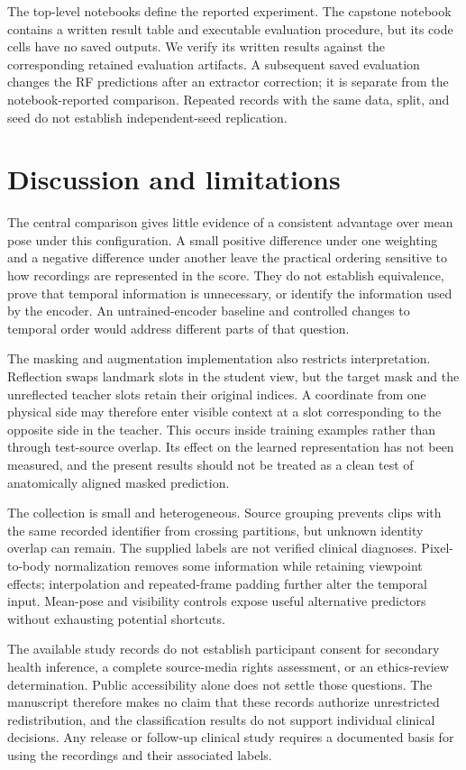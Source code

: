 \documentclass[10pt,twocolumn,letterpaper]{article}
\begin{document}
The top-level notebooks define the reported experiment. The capstone notebook contains a written result table and executable evaluation procedure, but its code cells have no saved outputs. We verify its written results against the corresponding retained evaluation artifacts. A subsequent saved evaluation changes the RF predictions after an extractor correction; it is separate from the notebook-reported comparison. Repeated records with the same data, split, and seed do not establish independent-seed replication.

\section{Discussion and limitations}
The central comparison gives little evidence of a consistent advantage over mean pose under this configuration. A small positive difference under one weighting and a negative difference under another leave the practical ordering sensitive to how recordings are represented in the score. They do not establish equivalence, prove that temporal information is unnecessary, or identify the information used by the encoder. An untrained-encoder baseline and controlled changes to temporal order would address different parts of that question.

The masking and augmentation implementation also restricts interpretation. Reflection swaps landmark slots in the student view, but the target mask and the unreflected teacher slots retain their original indices. A coordinate from one physical side may therefore enter visible context at a slot corresponding to the opposite side in the teacher. This occurs inside training examples rather than through test-source overlap. Its effect on the learned representation has not been measured, and the present results should not be treated as a clean test of anatomically aligned masked prediction.

The collection is small and heterogeneous. Source grouping prevents clips with the same recorded identifier from crossing partitions, but unknown identity overlap can remain. The supplied labels are not verified clinical diagnoses. Pixel-to-body normalization removes some information while retaining viewpoint effects; interpolation and repeated-frame padding further alter the temporal input. Mean-pose and visibility controls expose useful alternative predictors without exhausting potential shortcuts.

The available study records do not establish participant consent for secondary health inference, a complete source-media rights assessment, or an ethics-review determination. Public accessibility alone does not settle those questions. The manuscript therefore makes no claim that these records authorize unrestricted redistribution, and the classification results do not support individual clinical decisions. Any release or follow-up clinical study requires a documented basis for using the recordings and their associated labels.
\end{document}
